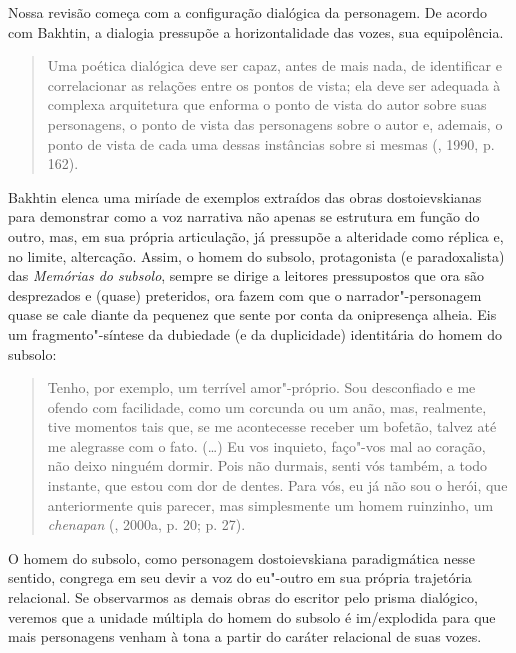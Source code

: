 Nossa revisão começa com a configuração dialógica da personagem. De
acordo com Bakhtin, a dialogia pressupõe a horizontalidade das vozes,
sua equipolência.

\begin{quote}
Uma poética dialógica deve ser capaz, antes de mais nada, de identificar
e correlacionar as relações entre os pontos de vista; ela deve ser
adequada à complexa arquitetura que enforma o ponto de vista do autor
sobre suas personagens, o ponto de vista das personagens sobre o autor
e, ademais, o ponto de vista de cada uma dessas instâncias sobre si
mesmas (, 1990, p. 162).
\end{quote}

Bakhtin elenca uma miríade de exemplos extraídos das obras
dostoievskianas para demonstrar como a voz narrativa não apenas se
estrutura em função do outro, mas, em sua própria articulação, já
pressupõe a alteridade como réplica e, no limite, altercação. Assim, o
homem do subsolo, protagonista (e paradoxalista) das \emph{Memórias do
subsolo}, sempre se dirige a leitores pressupostos que ora são
desprezados e (quase) preteridos, ora fazem com que o
narrador"-personagem quase se cale diante da pequenez que sente por conta
da onipresença alheia. Eis um fragmento"-síntese da dubiedade (e da
duplicidade) identitária do homem do subsolo:

\begin{quote}
Tenho, por exemplo, um terrível amor"-próprio. Sou desconfiado e me
ofendo com facilidade, como um corcunda ou um anão, mas, realmente, tive
momentos tais que, se me acontecesse receber um bofetão, talvez até me
alegrasse com o fato. (\ldots) Eu vos inquieto, faço"-vos mal ao coração,
não deixo ninguém dormir. Pois não durmais, senti vós também, a todo
instante, que estou com dor de dentes. Para vós, eu já não sou o herói,
que anteriormente quis parecer, mas simplesmente um homem ruinzinho, um
\emph{chenapan} (, 2000a, p. 20; p. 27).
\end{quote}

O homem do subsolo, como personagem dostoievskiana paradigmática nesse
sentido, congrega em seu devir a voz do eu"-outro em sua própria
trajetória relacional. Se observarmos as demais obras do escritor pelo
prisma dialógico, veremos que a unidade múltipla do homem do subsolo é
im/explodida para que mais personagens venham à tona a partir do caráter
relacional de suas vozes.

